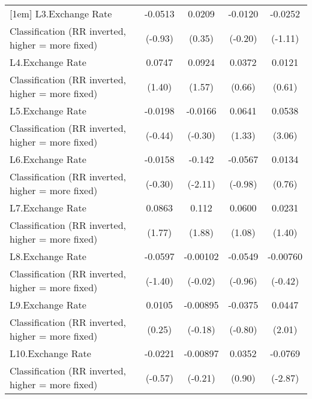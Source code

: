 {\begin{tabular}{l*{4}{c}}
[1em]
L3.Exchange Rate    &     -0.0513         &      0.0209         &     -0.0120         &     -0.0252         \\
Classification (RR inverted, higher = more fixed)&     (-0.93)         &      (0.35)         &     (-0.20)         &     (-1.11)         \\
[1em]
L4.Exchange Rate    &      0.0747         &      0.0924         &      0.0372         &      0.0121         \\
Classification (RR inverted, higher = more fixed)&      (1.40)         &      (1.57)         &      (0.66)         &      (0.61)         \\
[1em]
L5.Exchange Rate    &     -0.0198         &     -0.0166         &      0.0641         &      0.0538\sym{**} \\
Classification (RR inverted, higher = more fixed)&     (-0.44)         &     (-0.30)         &      (1.33)         &      (3.06)         \\
[1em]
L6.Exchange Rate    &     -0.0158         &      -0.142\sym{*}  &     -0.0567         &      0.0134         \\
Classification (RR inverted, higher = more fixed)&     (-0.30)         &     (-2.11)         &     (-0.98)         &      (0.76)         \\
[1em]
L7.Exchange Rate    &      0.0863         &       0.112         &      0.0600         &      0.0231         \\
Classification (RR inverted, higher = more fixed)&      (1.77)         &      (1.88)         &      (1.08)         &      (1.40)         \\
[1em]
L8.Exchange Rate    &     -0.0597         &    -0.00102         &     -0.0549         &    -0.00760         \\
Classification (RR inverted, higher = more fixed)&     (-1.40)         &     (-0.02)         &     (-0.96)         &     (-0.42)         \\
[1em]
L9.Exchange Rate    &      0.0105         &    -0.00895         &     -0.0375         &      0.0447\sym{*}  \\
Classification (RR inverted, higher = more fixed)&      (0.25)         &     (-0.18)         &     (-0.80)         &      (2.01)         \\
[1em]
L10.Exchange Rate   &     -0.0221         &    -0.00897         &      0.0352         &     -0.0769\sym{**} \\
Classification (RR inverted, higher = more fixed)&     (-0.57)         &     (-0.21)         &      (0.90)         &     (-2.87)         \\

\end{tabular}}
